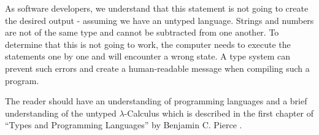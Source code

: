 As software developers, we understand that this statement
is not going to create the desired output - assuming we have an untyped
language. Strings and numbers are not
of the same type and cannot be subtracted from one another. To determine
that this is not going to work, the computer needs to execute
the statements one by one and will encounter a wrong state.
A type system can prevent such errors and create a
human-readable message when compiling such a program.

The reader should have an understanding of programming
languages and a brief understanding of the untyped
$\lambda$-Calculus which is described in the first
chapter of ``Types and Programming Languages'' by
Benjamin C. Pierce \cite{pierce2002ProgLang}.
